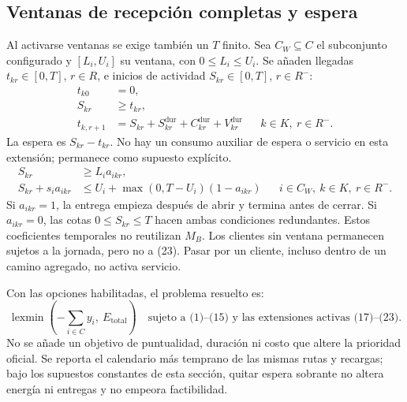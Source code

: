 \documentclass[11pt,a4paper]{article}
\newcommand{\Rminus}{R^{-}}
\begin{document}
\subsection{Ventanas de recepción completas y espera}
Al activarse ventanas se exige también un $T$ finito. Sea $C_W\subseteq C$
el subconjunto configurado y $[L_i,U_i]$ su ventana, con $0\le L_i\le U_i$.
Se añaden llegadas $t_{kr}\in[0,T]$, $r\in R$, e inicios de actividad
$S_{kr}\in[0,T]$, $r\in\Rminus$:
\begin{equation}
\begin{aligned}
t_{k0}&=0,\\
S_{kr}&\ge t_{kr},\\
t_{k,r+1}&=S_{kr}+S_{kr}^{\mathrm{dur}}
+C_{kr}^{\mathrm{dur}}+V_{kr}^{\mathrm{dur}}
&& k\in K,\ r\in\Rminus.
\end{aligned} \tag{22}
\end{equation}
La espera es $S_{kr}-t_{kr}$. No hay un consumo auxiliar de espera o servicio
en esta extensión; permanece como supuesto explícito.
\begin{equation}
\begin{aligned}
S_{kr}&\ge L_i a_{ikr},\\
S_{kr}+s_i a_{ikr}
&\le U_i+\max(0,T-U_i)(1-a_{ikr})
&& i\in C_W,\ k\in K,\ r\in\Rminus.
\end{aligned} \tag{23}
\end{equation}
Si $a_{ikr}=1$, la entrega empieza después de abrir y termina antes de
cerrar. Si $a_{ikr}=0$, las cotas $0\le S_{kr}\le T$ hacen ambas condiciones
redundantes. Estos coeficientes temporales no reutilizan $M_B$. Los clientes
sin ventana permanecen sujetos a la jornada, pero no a (23).
Pasar por un cliente, incluso dentro de un camino agregado, no activa servicio.

Con las opciones habilitadas, el problema resuelto es:
\begin{equation}
\boxed{\operatorname{lexmin}\left(-\sum_{i\in C}y_i,\ E_{\mathrm{total}}\right)
\quad\text{sujeto a (1)--(15) y las extensiones activas (17)--(23).}} \tag{24}
\end{equation}
No se añade un objetivo de puntualidad, duración ni costo que altere la
prioridad oficial. Se reporta el calendario más temprano de las mismas
rutas y recargas; bajo los supuestos constantes de esta sección, quitar
espera sobrante no altera energía ni entregas y no empeora factibilidad.
\end{document}
